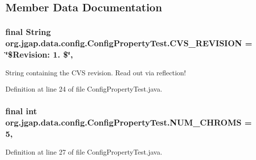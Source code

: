 \subsection{Member Data Documentation}
\hypertarget{classorg_1_1jgap_1_1data_1_1config_1_1_config_property_test_a2b72d5a16b25f3e2c089af54a17994fd}{
\subsubsection[{C\-V\-S\-\_\-\-R\-E\-V\-I\-S\-I\-O\-N}]{\setlength{\rightskip}{0pt plus 5cm}final String org.\-jgap.\-data.\-config.\-Config\-Property\-Test.\-C\-V\-S\-\_\-\-R\-E\-V\-I\-S\-I\-O\-N = \char`\"{}\$Revision\-: 1. \$\char`\"{}\hspace{0.3cm}{\ttfamily [static]}, {\ttfamily [private]}}}\label{classorg_1_1jgap_1_1data_1_1config_1_1_config_property_test_a2b72d5a16b25f3e2c089af54a17994fd}
String containing the C\-V\-S revision. Read out via reflection! 

Definition at line 24 of file Config\-Property\-Test.\-java.

\hypertarget{classorg_1_1jgap_1_1data_1_1config_1_1_config_property_test_a6b21e94d479716089d6da787f0dce1ff}{
\subsubsection[{N\-U\-M\-\_\-\-C\-H\-R\-O\-M\-S}]{\setlength{\rightskip}{0pt plus 5cm}final int org.\-jgap.\-data.\-config.\-Config\-Property\-Test.\-N\-U\-M\-\_\-\-C\-H\-R\-O\-M\-S = 5\hspace{0.3cm}{\ttfamily [static]}, {\ttfamily [private]}}}\label{classorg_1_1jgap_1_1data_1_1config_1_1_config_property_test_a6b21e94d479716089d6da787f0dce1ff}


Definition at line 27 of file Config\-Property\-Test.\-java.

